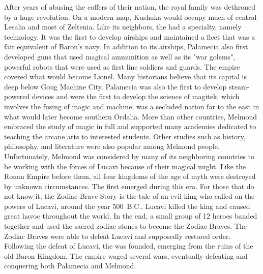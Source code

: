 After years of abusing the coffers of their nation, the royal family was dethroned by a huge revolution. 
On a modern map, Kushuka would occupy much of central Lesalia and most of Zeltenia.
Like its neighbors, the  had a specialty, namely technology. 
It was the first to develop airships and maintained a fleet that was a fair equivalent of Baron's navy. 
In addition to its airships, Palamecia also first developed guns that used magical ammunition as well as its "war golems", powerful robots that were used as first line soldiers and guards. 
The empire covered what would become Lionel. 
Many historians believe that its capital is deep below Goug Machine City. 
Palamecia was also the first to develop steam-powered devices and were the first to develop the science of magitek, which involves the fusing of magic and machine.
 was a secluded nation far to the east in what would later become southern Ordalia. 
More than other countries, Melmond embraced the study of magic in full and supported many academies dedicated to teaching the arcane arts to interested students. 
Other studies such as history, philosophy, and literature were also popular among Melmond people. 
Unfortunately, Melmond was considered by many of its neighboring countries to be working with the forces of Lucavi because of their magical might.
Like the Ronan Empire before them, all four kingdoms of the age of myth were destroyed by unknown circumstances. 
The  first emerged during this era. 
For those that do not know it, the Zodiac Brave Story is the tale of an evil king who called on the powers of Lucavi, around the year 500~B.C..
Lucavi killed the king and caused great havoc throughout the world. 
In the end, a small group of 12 heroes banded together and used the sacred zodiac stones to become the Zodiac Braves. 
The Zodiac Braves were able to defeat Lucavi and supposedly restored order. 
Following the defeat of Lucavi, the  was founded, emerging from the ruins of the old Baron Kingdom.
The empire waged several wars, eventually defeating and conquering both Palamecia and Melmond.
%
\vfill

